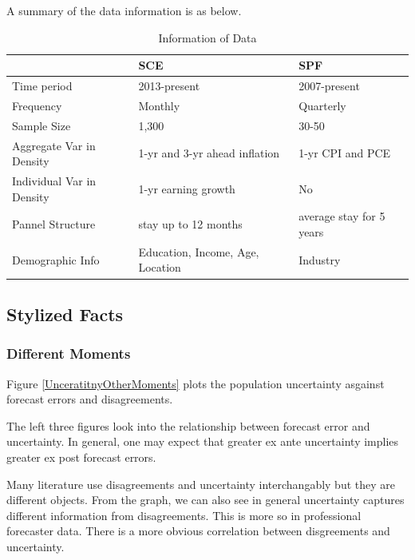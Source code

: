 \documentclass[]{article}
\begin{document}
A summary of the data information is as below. 

\begin{table}[]
			\caption{Information of Data}
	\begin{tabular}{lll}

		\hline 
		& SCE & SPF        \\
		\hline 
		Time period                                    & 2013-present                            & 2007-present             \\
		Frequency                                      & Monthly                                 & Quarterly                \\
		Sample Size                                    & 1,300                                   & 30-50                    \\
		Aggregate Var in Density                       & 1-yr  and 3-yr ahead inflation          & 1-yr CPI and PCE         \\
		Individual Var in Density                      & 1-yr earning growth                     & No                       \\
		Pannel Structure                               & stay up to 12 months                    & average stay for 5 years \\
		Demographic Info                        & Education, Income, Age, Location        & Industry    \\
		\hline 
	\end{tabular}
\end{table}


\subsection{Stylized Facts}

\subsubsection{Different Moments}

Figure \ref{UnceratitnyOtherMoments} plots the population uncertainty asgainst forecast errors and disagreements. 


The left  three figures look into the relationship between forecast error and uncertainty. In general, one may expect that  greater ex ante uncertainty implies greater ex post forecast errors. 

Many literature use disagreements and uncertainty interchangably but they are different objects. From the graph, we can also see in general uncertainty captures different information from disagreements. This is more so in professional forecaster data. There is a more obvious correlation between disgreements and uncertainty. 
\end{document}
